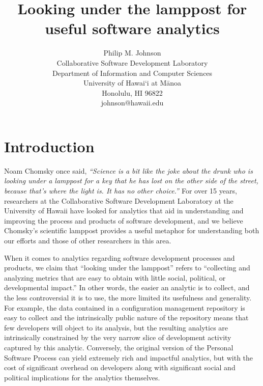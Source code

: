 \documentclass[]{article}
\begin{document}


\title{{\bf Looking under the lamppost for useful software analytics}} 

\author{Philip M. Johnson\\
        Collaborative Software Development Laboratory\\
        Department of Information and Computer Sciences\\
        University of Hawai`i at M\=anoa\\
        Honolulu, HI 96822\\
        johnson@hawaii.edu\\
}


\maketitle

\thispagestyle{empty}


\setlength{\parskip}{3pt plus 1pt minus 1pt} 

\section{Introduction}
Noam Chomsky once said, {\em ``Science is a bit like the joke about the drunk who is looking under a lamppost for a key that he has lost on the other side of the street, because that's where the light is. It has no other choice.'' \cite{Barsky98}} For over 15 years, researchers at the Collaborative Software Development Laboratory at the University of Hawaii have looked for analytics that aid in understanding and improving the process and products of software development, and we believe Chomsky's scientific lamppost provides a useful metaphor for understanding both our efforts and those of other researchers in this area.

When it comes to analytics regarding software development processes and products, we claim
that ``looking under the lamppost'' refers to ``collecting and analyzing metrics that are easy
to obtain with little social, political, or developmental impact.''  In other words, the
easier an analytic is to collect,  and the less controversial it is to use, the more
limited its usefulness and generality.  For example, the data contained in a configuration
management repository is easy to collect and the intrinsically public nature of the
repository means that few developers will object to its analysis, but the
resulting analytics are intrinsically constrained by the very narrow slice of development
activity captured by this analytic. Conversely, the original version of the
Personal Software Process can yield extremely rich and impactful analytics, but with the
cost of significant overhead on developers along with significant social and political
implications for the analytics themselves.
\end{document}
